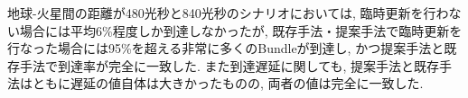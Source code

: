 地球-火星間の距離が480光秒と840光秒のシナリオにおいては, 
臨時更新を行わない場合には平均6\%程度しか到達しなかったが,
既存手法・提案手法で臨時更新を行なった場合には95\%を超える非常に多くのBundleが到達し, 
かつ提案手法と既存手法で到達率が完全に一致した.
また到達遅延に関しても, 提案手法と既存手法はともに遅延の値自体は大きかったものの, 両者の値は完全に一致した. 




